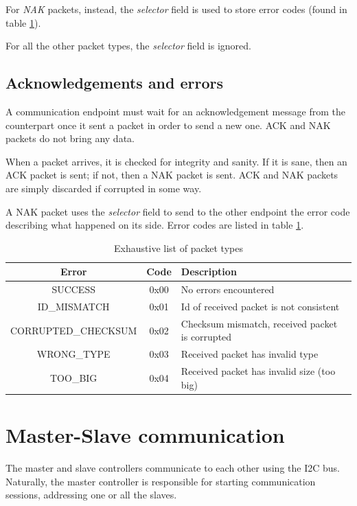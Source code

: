 \documentclass[binding=0.6cm,Lau]{sapthesis}
\begin{document}
For \emph{NAK} packets, instead, the \emph{selector} field is used to store
error codes (found in table \ref{tab:packet-error-codes}).

For all the other packet types, the \emph{selector} field is ignored.

\section{Acknowledgements and errors}
A communication endpoint must wait for an acknowledgement message from the
counterpart once it sent a packet in order to send a new one. ACK and NAK
packets do not bring any data.

When a packet arrives, it is checked for integrity and sanity. If it is sane,
then an ACK packet is sent; if not, then a NAK packet is sent.
ACK and NAK packets are simply discarded if corrupted in some way.

A NAK packet uses the \emph{selector} field to send to the other endpoint the
error code describing what happened on its side. Error codes are listed in
table \ref{tab:packet-error-codes}.

\begin{table}[bh]
  \begin{tabularx}{\textwidth}{c c X}
    \toprule
    Error & Code & Description \\
    \midrule
    SUCCESS             & 0x00 & No errors encountered \\
    ID\_MISMATCH        & 0x01 & Id of received packet is not consistent \\
    CORRUPTED\_CHECKSUM & 0x02 & Checksum mismatch, received packet is corrupted \\
    WRONG\_TYPE         & 0x03 & Received packet has invalid type \\
    TOO\_BIG            & 0x04 & Received packet has invalid size (too big) \\
    \bottomrule
  \end{tabularx}
  \caption{Exhaustive list of packet types}
  \label{tab:packet-error-codes}
\end{table}


\chapter{Master-Slave communication}
\label{ch:master-slave-comm}
The master and slave controllers communicate to each other using the I2C
bus. Naturally, the master controller is responsible for starting communication
sessions, addressing one or all the slaves.
\end{document}
